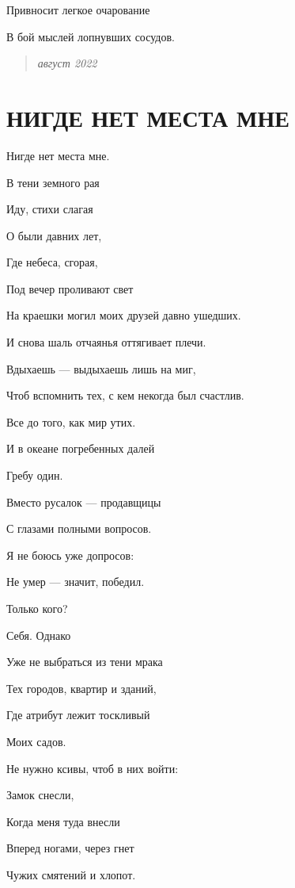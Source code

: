 \documentclass[
  a5paperpaper,
  DIV=11,
  numbers=noendperiod]{scrreprt}
\begin{document}
Привносит легкое очарование

В бой мыслей лопнувших сосудов.

\begin{quote}
\emph{август 2022}
\end{quote}

\section*{НИГДЕ НЕТ МЕСТА
МНЕ}\label{ux43dux438ux433ux434ux435-ux43dux435ux442-ux43cux435ux441ux442ux430-ux43cux43dux435}


Нигде нет места мне.

В тени земного рая

Иду, стихи слагая

О были давних лет,

Где небеса, сгорая,

Под вечер проливают свет

На краешки могил моих друзей давно ушедших.

И снова шаль отчаянья оттягивает плечи.

Вдыхаешь --- выдыхаешь лишь на миг,

Чтоб вспомнить тех, с кем некогда был счастлив.

Все до того, как мир утих.

И в океане погребенных далей

Гребу один.

Вместо русалок --- продавщицы

С глазами полными вопросов.

Я не боюсь уже допросов:

Не умер --- значит, победил.

Только кого?

Себя. Однако

Уже не выбраться из тени мрака

Тех городов, квартир и зданий,

Где атрибут лежит тоскливый

Моих садов.

Не нужно ксивы, чтоб в них войти:

Замок снесли,

Когда меня туда внесли

Вперед ногами, через гнет

Чужих смятений и хлопот.
\end{document}

